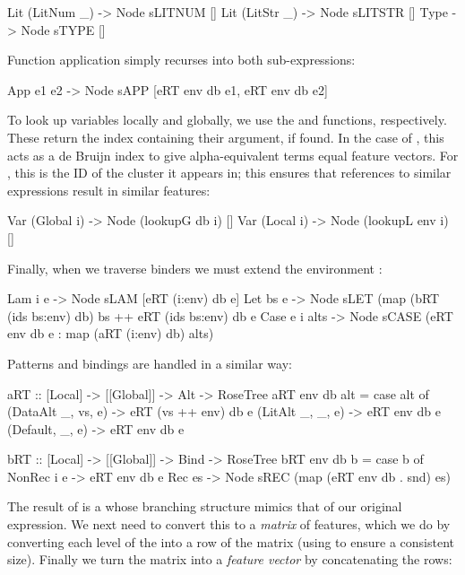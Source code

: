 \begin{haskell}
  Lit (LitNum _) -> Node sLITNUM []
  Lit (LitStr _) -> Node sLITSTR []
  Type           -> Node sTYPE   []
\end{haskell}

Function application simply recurses into both sub-expressions:

\begin{haskell}
  App e1 e2 -> Node sAPP [eRT env db e1,
                          eRT env db e2]
\end{haskell}

To look up variables locally and globally, we use the  and  functions, respectively. These return the index containing their argument, if found. In the case of , this acts as a de Bruijn index to give alpha-equivalent terms equal feature vectors. For , this is the ID of the cluster it appears in; this ensures that references to similar expressions result in similar features:

\begin{haskell}
  Var (Global i) -> Node (lookupG db  i) []
  Var (Local  i) -> Node (lookupL env i) []
\end{haskell}

Finally, when we traverse binders we must extend the environment :

\begin{haskell}
  Lam  i  e     -> Node sLAM [eRT (i:env) db e]
  Let  bs e     -> Node sLET (map (bRT (ids bs:env) db) bs ++
                                   eRT (ids bs:env) db  e
  Case e i alts -> Node sCASE (eRT    env  db  e :
                          map (aRT (i:env) db) alts)
\end{haskell}

Patterns and bindings are handled in a similar way:

\begin{haskell}
aRT :: [Local] -> [[Global]] -> Alt -> RoseTree
aRT env db alt = case alt of
  (DataAlt _, vs, e) -> eRT (vs ++ env) db e
  (LitAlt  _, _,  e) -> eRT env db e
  (Default,   _,  e) -> eRT env db e

bRT :: [Local] -> [[Global]] -> Bind -> RoseTree
bRT env db b = case b of
  NonRec i e -> eRT env db e
  Rec es     -> Node sREC (map (eRT env db . snd) es)
\end{haskell}

The result of  is a  whose branching structure mimics that of our original expression. We next need to convert this to a \emph{matrix} of features, which we do by converting each level of the  into a row of the matrix (using  to ensure a consistent size). Finally we turn the matrix into a \emph{feature vector} by concatenating the rows:

